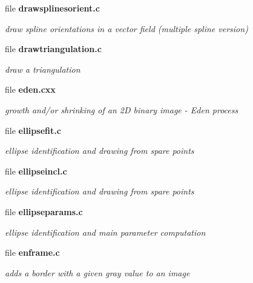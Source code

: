 \begin{CompactItemize}
\item 
file \bf{drawsplinesorient.c}
\begin{CompactList}\small\item\em draw spline orientations in a vector field (multiple spline version) \item\end{CompactList}

\item 
file \bf{drawtriangulation.c}
\begin{CompactList}\small\item\em draw a triangulation \item\end{CompactList}

\item 
file \bf{eden.cxx}
\begin{CompactList}\small\item\em growth and/or shrinking of an 2D binary image - Eden process \item\end{CompactList}

\item 
file \bf{ellipsefit.c}
\begin{CompactList}\small\item\em ellipse identification and drawing from spare points \item\end{CompactList}

\item 
file \bf{ellipseincl.c}
\begin{CompactList}\small\item\em ellipse identification and drawing from spare points \item\end{CompactList}

\item 
file \bf{ellipseparams.c}
\begin{CompactList}\small\item\em ellipse identification and main parameter computation \item\end{CompactList}

\item 
file \bf{enframe.c}
\begin{CompactList}\small\item\em adds a border with a given gray value to an image \item\end{CompactList}


\end{CompactItemize}
